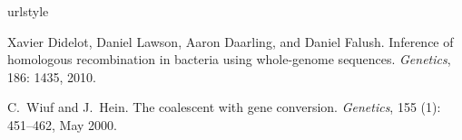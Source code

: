 \documentclass[a4paper,10pt]{article}
\begin{document}





%
%

\begin{thebibliography}{2}
\providecommand{\natexlab}[1]{#1}
\providecommand{\url}[1]{\texttt{#1}}
\expandafter\ifx\csname urlstyle\endcsname\relax
  \providecommand{\doi}[1]{doi: #1}\else
  \providecommand{\doi}{doi: \begingroup \urlstyle{rm}\Url}\fi

Xavier Didelot, Daniel Lawson, Aaron Daarling, and Daniel Falush.
\newblock Inference of homologous recombination in bacteria using whole-genome
  sequences.
\newblock \emph{Genetics}, 186: 1435, 2010.

C.~Wiuf and J.~Hein.
\newblock The coalescent with gene conversion.
\newblock \emph{Genetics}, 155 (1): 451--462, May 2000.

\end{thebibliography}
\end{document}
